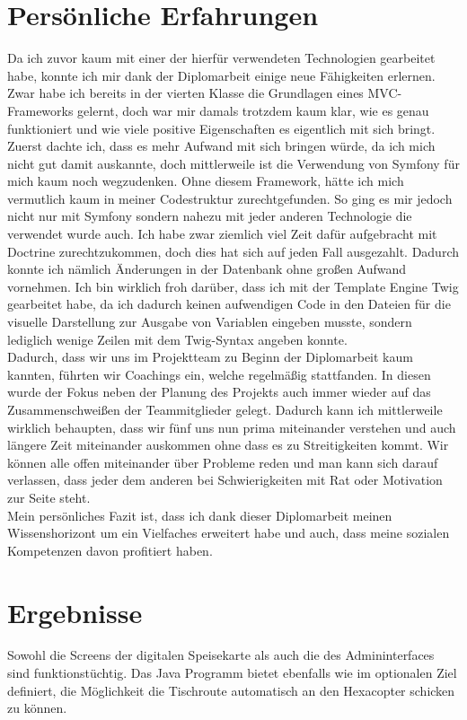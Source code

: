 \chapter{Persönliche Erfahrungen}
Da ich zuvor kaum mit einer der hierfür verwendeten Technologien gearbeitet habe, konnte ich mir dank der Diplomarbeit einige neue Fähigkeiten erlernen.
Zwar habe ich bereits in der vierten Klasse die Grundlagen eines MVC-Frameworks gelernt, doch war mir damals trotzdem kaum klar, wie es genau funktioniert und wie viele positive Eigenschaften es eigentlich mit sich bringt.
Zuerst dachte ich, dass es mehr Aufwand mit sich bringen würde, da ich mich nicht gut damit auskannte, doch mittlerweile ist die Verwendung von Symfony für mich kaum noch wegzudenken. Ohne diesem Framework, hätte ich mich vermutlich kaum in meiner Codestruktur zurechtgefunden.
So ging es mir jedoch nicht nur mit Symfony sondern nahezu mit jeder anderen Technologie die verwendet wurde auch.
Ich habe zwar ziemlich viel Zeit dafür aufgebracht mit Doctrine zurechtzukommen, doch dies hat sich auf jeden Fall ausgezahlt. Dadurch konnte ich nämlich Änderungen in der Datenbank ohne großen Aufwand vornehmen.
Ich bin wirklich froh darüber, dass ich mit der Template Engine Twig gearbeitet habe, da ich dadurch keinen aufwendigen Code in den Dateien für die visuelle Darstellung zur Ausgabe von Variablen eingeben musste, sondern lediglich wenige Zeilen mit dem Twig-Syntax angeben konnte.
\\
Dadurch, dass wir uns im Projektteam zu Beginn der Diplomarbeit kaum kannten, führten wir Coachings ein, welche regelmäßig stattfanden. In diesen wurde der Fokus neben der Planung des Projekts auch immer wieder auf das Zusammenschweißen der Teammitglieder gelegt. Dadurch kann ich mittlerweile wirklich behaupten, dass wir fünf uns nun prima miteinander verstehen und auch längere Zeit miteinander auskommen ohne dass es zu Streitigkeiten kommt. Wir können alle offen miteinander über Probleme reden und man kann sich darauf verlassen, dass jeder dem anderen bei Schwierigkeiten mit Rat oder Motivation zur Seite steht.
\\
Mein persönliches Fazit ist, dass ich dank dieser Diplomarbeit meinen Wissenshorizont um ein Vielfaches erweitert habe und auch, dass meine sozialen Kompetenzen davon profitiert haben.

\chapter{Ergebnisse}
Sowohl die Screens der digitalen Speisekarte als auch die des Admininterfaces sind funktionstüchtig.
Das Java Programm bietet ebenfalls wie im optionalen Ziel definiert, die Möglichkeit die Tischroute automatisch an den Hexacopter schicken zu können.

